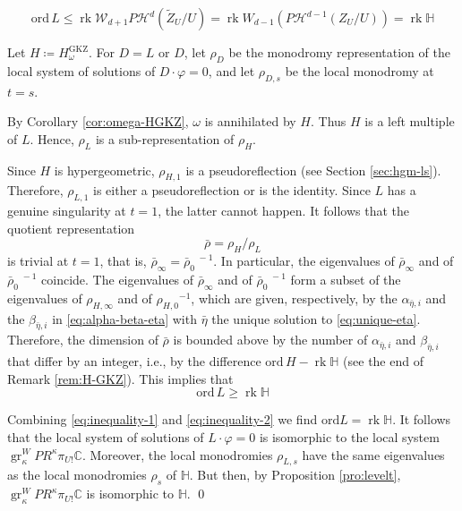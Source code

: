 \documentclass[11pt, reqno]{amsart}
\theoremstyle{plain}
\theoremstyle{definition}
\newcommand{\CC}{\mathbb{C}}
\newcommand{\HH}{\mathbb{H}}
\DeclareMathOperator{\rk}{rk}
\DeclareMathOperator{\gr}{gr}
\begin{document}
\begin{equation} 
\label{eq:inequality-1}
\mathrm{ord} \, L \leq \rk \mathcal{W}_{d+1}P\mathcal{H}^d(\widetilde{Z}_U/U)= \rk {W}_{d-1}(P\mathcal{H}^{d-1}(Z_U/U))= \rk\HH
\end{equation}


Let $H \coloneqq H^{\mathrm{GKZ}}_\omega$.
For $D=L$ or $D$, let $\rho_{D}$ be the monodromy representation of the local system of solutions of $D \cdot \varphi=0$, and let $\rho_{D,s}$ be the local monodromy at $t=s$. 

By Corollary \ref{cor:omega-HGKZ},  $\omega$ is annihilated by $H$. Thus  $H$ is a left multiple of $L$. Hence, $\rho_L$ is a sub-representation of  $\rho_H$. 

Since $H$ is hypergeometric, $\rho_{H, 1}$ is a pseudoreflection (see Section \ref{sec:hgm-ls}). Therefore, $\rho_{L,1}$ is either a pseudoreflection or is the identity. 
Since $L$ has a genuine singularity at $t=1$, the latter cannot happen. 
It follows that the quotient representation 
\[ \bar{\rho}=\rho_H/\rho_L
\] is trivial at $t=1$, that is,  $\bar{\rho}_{\infty}= {\bar{\rho}_{0}}^{\; -1}$. In particular, the eigenvalues of 
$\bar{\rho}_{\infty}$ and of ${\bar{\rho}_{0}}^{\; -1}$ coincide.
The eigenvalues of 
$\bar{\rho}_{\infty}$ and of ${\bar{\rho}_{0}}^{\; -1}$ form a subset of the eigenvalues of 
${\rho}_{H,\infty}$ and of ${{\rho}_{H,0}}^{-1}$, which are given, respectively, by the $\alpha_{\bar{\eta},i}$ and the $\beta_{\bar{\eta},i}$ in \eqref{eq:alpha-beta-eta} with $\bar{\eta}$ the unique solution to \eqref{eq:unique-eta}. Therefore, the dimension of $\bar{\rho}$ is bounded above by the number of $\alpha_{\bar{\eta},i}$ and $\beta_{\bar{\eta},i}$ that differ by an integer, i.e., by the difference $\mathrm{ord}\,H - \rk \HH$ (see the end of Remark \ref{rem:H-GKZ}). 
This implies that 
\begin{equation}
\label{eq:inequality-2}
\mathrm{ord} \,L \geq \rk \HH 
\end{equation} 

Combining \eqref{eq:inequality-1} and \eqref{eq:inequality-2} we find
$
\mathrm{ord} L= \rk\HH
$. It follows that the local system of solutions of $L \cdot \varphi =0$ is isomorphic to 
the local system
$\gr^W_{\kappa} PR^{\kappa} \pi_{U !} \CC$. 
Moreover, the local monodromies $\rho_{L,s}$ have the same eigenvalues as the local monodromies $\rho_s$ of $\HH$.
But then, by Proposition \ref{pro:levelt}, $\gr^W_{\kappa} PR^{\kappa} \pi_{U !} \CC$ is isomorphic to $\HH$.  \qed
\smallskip
\end{document}
